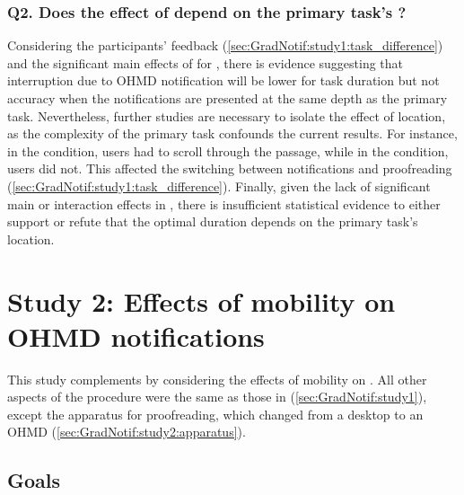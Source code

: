 \subsubsection*{Q2. Does the effect of \fading{} depend on the primary task's \location{}?}

Considering the participants' feedback (\autoref{sec:GradNotif:study1:task_difference}) and the significant main effects of \location{} for \readingTime{}, there is evidence suggesting that interruption due to OHMD notification will be lower for task duration but not accuracy when the notifications are presented at the same depth as the primary task. Nevertheless, further studies are necessary to isolate the effect of location, as the complexity of the primary task confounds the current results. For instance, in the \glass{} condition, users had to scroll through the passage, while in the \desktop{} condition, users did not. This affected the switching between notifications and proofreading (\autoref{sec:GradNotif:study1:task_difference}). Finally, given the lack of significant main or interaction effects in \adjustedReadingAccuracy{}, there is insufficient statistical evidence to either support or refute that the optimal \fading{} duration depends on the primary task's location.



























\section{Study 2: Effects of mobility on \fading{} OHMD notifications}
\label{sec:GradNotif:study2}

This study complements \studyone{} by considering the effects of mobility on \fading{} \animation{}. All other aspects of the procedure were the same as those in \studyone{} (\autoref{sec:GradNotif:study1}), except the apparatus for proofreading, which changed from a desktop to an OHMD (\autoref{sec:GradNotif:study2:apparatus}).

\subsection{Goals}

